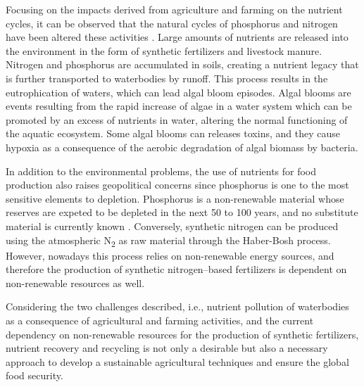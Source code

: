 \begin{refsection}[referencesCh1]
Focusing on the impacts derived from agriculture and farming on the nutrient cycles, it can be observed that the natural cycles of phosphorus and nitrogen have been altered these activities \citep{Bouwman2009}. Large amounts of nutrients are released into the environment in the form of synthetic fertilizers and livestock manure. Nitrogen and phosphorus are accumulated in soils, creating a nutrient legacy that is further transported to waterbodies by runoff. This process results in the eutrophication of waters, which can lead algal bloom episodes. Algal blooms are events resulting from the rapid increase of algae in a water system which can be promoted by an excess of nutrients in water, altering the normal functioning of the aquatic ecosystem. Some algal blooms can releases toxins, and they cause hypoxia as a consequence of the aerobic degradation of algal biomass by bacteria.

In addition to the environmental problems, the use of nutrients for food production also raises geopolitical concerns since phosphorus is one to the most sensitive elements to depletion. Phosphorus is a non-renewable material whose reserves are expeted to be depleted in the next 50 to 100 years, and no substitute material is currently known \citep{cordell2009story}. Conversely, synthetic nitrogen can be produced using the atmospheric N\textsubscript{2} as raw material through the Haber-Bosh process. However, nowadays this process relies on non-renewable energy sources, and therefore the production of synthetic nitrogen--based fertilizers is dependent on non-renewable resources as well.

Considering the two challenges described, i.e., nutrient pollution of waterbodies as a consequence of agricultural and farming activities, and the current dependency on non-renewable resources for the production of synthetic fertilizers, nutrient recovery and recycling is not only a desirable but also a necessary approach to develop a sustainable agricultural techniques and ensure the global food security.


\end{refsection}
